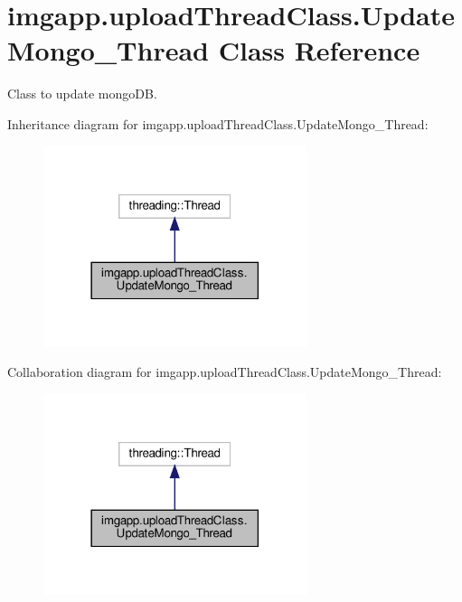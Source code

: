 \hypertarget{classimgapp_1_1uploadThreadClass_1_1UpdateMongo__Thread}{}\section{imgapp.\+upload\+Thread\+Class.\+Update\+Mongo\+\_\+\+Thread Class Reference}
\label{classimgapp_1_1uploadThreadClass_1_1UpdateMongo__Thread}


Class to update mongo\+DB.  




Inheritance diagram for imgapp.\+upload\+Thread\+Class.\+Update\+Mongo\+\_\+\+Thread\+:\nopagebreak
\begin{figure}[H]
\begin{center}
\leavevmode
\includegraphics[width=218pt]{classimgapp_1_1uploadThreadClass_1_1UpdateMongo__Thread__inherit__graph}
\end{center}
\end{figure}


Collaboration diagram for imgapp.\+upload\+Thread\+Class.\+Update\+Mongo\+\_\+\+Thread\+:\nopagebreak
\begin{figure}[H]
\begin{center}
\leavevmode
\includegraphics[width=218pt]{classimgapp_1_1uploadThreadClass_1_1UpdateMongo__Thread__coll__graph}
\end{center}
\end{figure}
